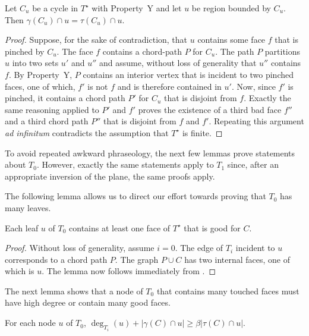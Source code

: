 \documentclass{patmorin}
\newcommand{\dual}[1]{{#1}^\star}
\begin{document}
\begin{lem}
   Let $C_u$ be a cycle in $\dual{T}$ with Property~Y and let $u$ be
   region bounded by $C_u$.  Then $\gamma(C_u)\cap u= \tau(C_u)\cap u$.
\end{lem}

\begin{proof}
   Suppose, for the sake of contradiction, that $u$ contains some face
   $f$ that is pinched by $C_u$.  The face $f$ contains a chord-path
   $P$ for $C_u$. The path $P$ partitions $u$ into two sets $u'$ and
   $u''$ and assume, without loss of generality that $u''$ contains $f$.
   By Property~Y, $P$ contains an interior vertex that is incident to two
   pinched faces, one of which, $f'$ is not $f$ and is therefore contained
   in $u'$.  Now, since $f'$ is pinched, it contains a chord path $P'$
   for $C_u$ that is disjoint from $f$.  Exactly the same reasoning
   applied to $P'$ and $f'$ proves the existence of a third bad face $f''$
   and a third chord path $P''$ that is disjoint from $f$ and $f'$.
   Repeating this argument \emph{ad infinitum} contradicts the assumption
   that $\dual{T}$ is finite.
\end{proof}

To avoid repeated awkward phraseology, the next few lemmas prove
statements about $T_0$.  However, exactly the same statements apply
to $T_1$ since, after an appropriate inversion of the plane, the same
proofs apply.

The following lemma allows us to direct our effort towards proving that
$T_0$ has many leaves.

\begin{lem}
   Each leaf $u$ of $T_0$ contains at least one face of $\dual{T}$
   that is good for $C$.
\end{lem}

\begin{proof}
   Without loss of generality, assume $i=0$.  The edge of $T_i$ incident
   to $u$ corresponds to a chord path $P$. The graph $P\cup C$ has two
   internal faces, one of which is $u$.  The lemma now follows immediately
   from .
\end{proof}

The next lemma shows that a node of $T_0$ that contains many touched
faces must have high degree or contain many good faces.
\begin{lem}
   For each node $u$ of $T_0$,  $\deg_{T_i}(u)+|\gamma(C)\cap u|\ge
   \beta|\tau(C)\cap u|$.
\end{lem}
\end{document}
